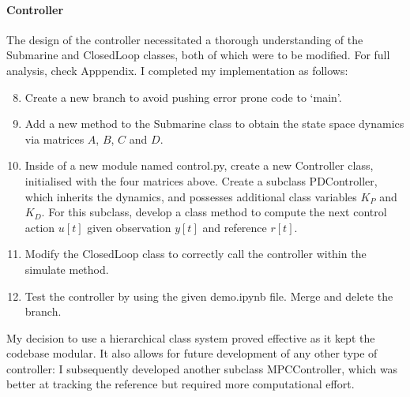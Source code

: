 \documentclass[hidelinks]{article}
\begin{document}
\paragraph{Controller}
The design of the controller necessitated a thorough understanding of the Submarine and ClosedLoop classes, both of which were to be modified.
For full analysis, check Apppendix. I completed my implementation as follows:
%
\begin{enumerate}
    \setcounter{enumi}{7}
    \item Create a new branch to avoid pushing error prone code to `main'.
    \item Add a new method to the Submarine class to obtain the state space dynamics via matrices $A$, $B$, $C$ and $D$.
    \item Inside of a new module named control.py, create a new Controller class, initialised with the four matrices above. Create a subclass PDController, which inherits the dynamics, and possesses additional class variables $K_P$ and $K_D$. For this subclass, develop a class method to compute the next control action $u[t]$ given observation $y[t]$ and reference $r[t]$.
    \item Modify the ClosedLoop class to correctly call the controller within the simulate method.
    \item Test the controller by using the given demo.ipynb file. Merge and delete the branch.
\end{enumerate}
My decision to use a hierarchical class system proved effective as it kept the codebase modular. It also allows for future development of any other type of controller: I subsequently developed another subclass MPCController, which was better at tracking the reference but required more computational effort.
%
\end{document}
